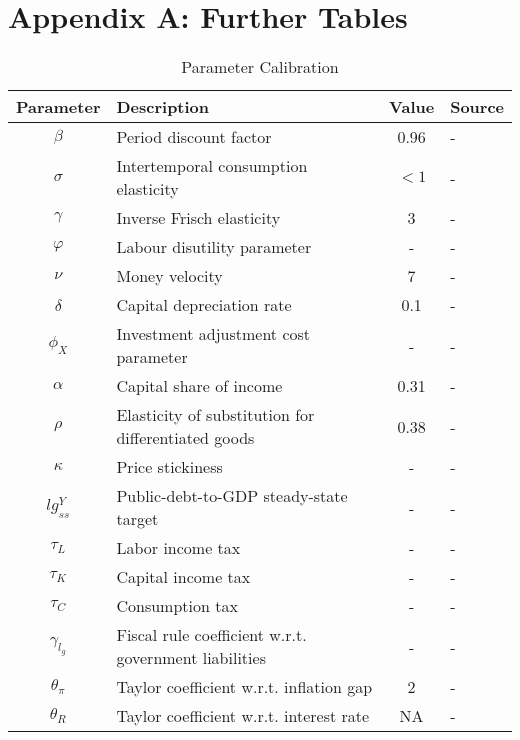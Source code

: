 \documentclass[12pt]{article}
\begin{document}
\section*{Appendix A: Further Tables}
\begin{table}[ht]
    \centering
    \caption{Parameter Calibration}
    \begin{tabular}{clcl}
        \toprule
        Parameter & Description & Value & Source \\ \midrule
        $\beta$ & Period discount factor  & 0.96 & - \\
        $\sigma$ & Intertemporal consumption elasticity  & $<1$ & - \\
        $\gamma$ & Inverse Frisch elasticity  & 3 & - \\
        $\varphi$ & Labour disutility parameter  & - & - \\
        $\nu$ & Money velocity  & 7 & - \\
        $\delta$ & Capital depreciation rate  & 0.1 & - \\
        $\phi_X$ & Investment adjustment cost parameter & - & - \\
        $\alpha$ & Capital share of income & 0.31 & - \\
        $\rho$ & Elasticity of substitution for differentiated goods &  0.38 & - \\
        $\kappa$ & Price stickiness & - & - \\
        $lg^Y_{ss}$ & Public-debt-to-GDP steady-state target & - & - \\
        ${\tau_L}$ & Labor income tax & - & - \\
        ${\tau_K}$ & Capital income tax & - & - \\
        ${\tau_C}$ & Consumption tax & - & -  \\
        ${\gamma_{l_g}}$ & Fiscal rule coefficient w.r.t. government liabilities & - & -  \\
        ${\theta_{\pi}}$ & Taylor coefficient w.r.t. inflation gap & 2 & - \\
        $\theta_R$ & Taylor coefficient w.r.t. interest rate & NA  & - \\  \bottomrule
    \end{tabular}
    \label{tab:parameters}
\end{table}
\end{document}
